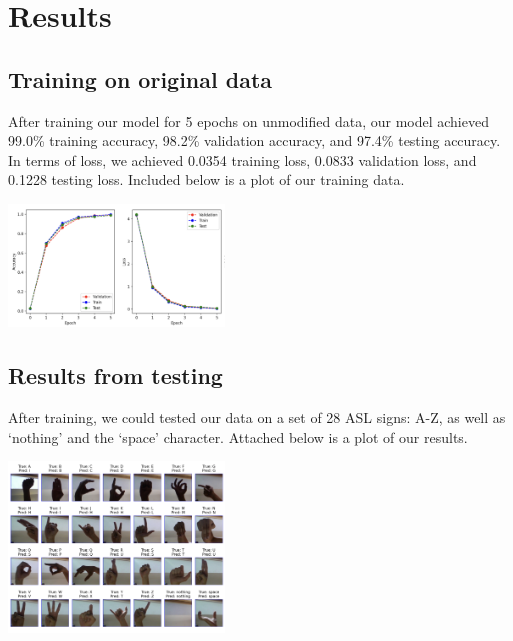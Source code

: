 \documentclass[10pt,twocolumn,letterpaper]{article}
\begin{document}



\section{Results}
\subsection{Training on original data}
After training our model for 5 epochs on unmodified data, our model achieved 99.0\% training accuracy,
98.2\% validation accuracy, and 97.4\% testing accuracy. In terms of loss, we achieved 0.0354 training
loss, 0.0833 validation loss, and 0.1228 testing loss. Included below is a plot of our training data.

\begin{center}
    \includegraphics[width=0.43\textwidth]{../writeup_imgs/model1Plot.png}
\end{center}

\subsection{Results from testing}
After training, we could tested our data on a set of 28 ASL signs: A-Z, as well as ‘nothing’
and the ‘space’ character. Attached below is a plot of our results.

\begin{center}
    \includegraphics[width=0.43\textwidth]{../writeup_imgs/test_output.png}
\end{center}
\end{document}

